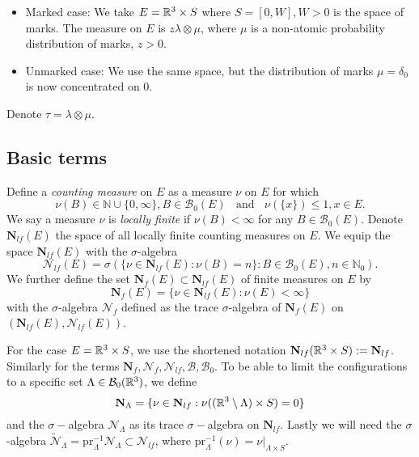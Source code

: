 \begin{itemize}
	\item Marked case: We take $E={\mathbb R^3}\times S$ where $S=[0,W],W>0$ is the space of marks. The measure on $E$ is $z\lambda \otimes \mu$, where $\mu$ is a non-atomic  probability distribution of marks, $z>0$. 
	\item Unmarked case: We use the same space, but the distribution of marks $\mu=\delta_0$ is now concentrated on $0$.
\end{itemize}
Denote $\tau = \lambda \otimes \mu$.


\subsection{Basic terms}\label{sec:basicPP}
\begin{definition}\label{def:measures}
Define a \textit{counting measure} on $E$ as a measure $\nu$ on $E$ for which
$$\nu(B)\in\mathbb N \cup \{0,\infty\}, B\in\mathcal B_0(E)\;\;\text{ and } \; \; \nu(\{x\})\leq 1, x\in E.$$
We say a measure $\nu$ is \textit{locally finite} if $\nu(B)<\infty$ for any $B\in \mathcal  B_0(E)$. Denote $\mathbf N_{lf}(E)$ the space of all locally finite counting measures on $E$.
We equip the space $\mathbf N_{lf}(E)$ with the $\sigma$-algebra
$$\mathcal N_{lf}(E)=\sigma(\{\nu \in \mathbf N_{lf}(E): \nu(B)=n\}: B \in \mathcal B_0(E), n\in \mathbb N_0).$$
We further define the set $\mathbf N_f(E) \subset \mathbf N_{lf}(E)$ of finite measures on $E$ by
$$\mathbf N_f(E) = \{\nu \in \mathbf N_{lf}(E): \nu(E)<\infty\}$$
with the $\sigma$-algebra $\mathcal N_{f}$ defined as the trace $\sigma$-algebra of $\mathbf N_{f}(E)$ on $(\mathbf N_{lf}(E),\mathcal N_{lf}(E))$.\newline
\end{definition}

For the case $E={\mathbb R^3}\times S$, we use the shortened notation $\mathbf N_{lf}({\mathbb R^3}\times S) := \mathbf N_{lf}$. Similarly for the terms $\mathbf N_{f}, \mathcal N_{f}, \mathcal N_{lf}, \mathcal B, \mathcal B_0$. To be able to limit the configurations to a specific set $\Lambda \in \mathcal B_0({\mathbb R^3})$, we define
$$\mathbf N_\Lambda = \{ \nu \in \mathbf N_{lf}: \nu( ({\mathbb R^3} \setminus \Lambda) \times S) = 0 \}$$
and the $\sigma-$algebra $\mathcal N_\Lambda$ as its trace $\sigma-$algebra on $\mathbf N_{lf}$. Lastly we will need the $\sigma$-algebra $\mathcal {\tilde N}_\Lambda = \mathrm{pr}_\Lambda^{-1} \mathcal N_\Lambda \subset \mathcal N_{lf}$, where $\mathrm{pr}_\Lambda^{-1}(\nu)=\nu|_{\Lambda\times S}$.


